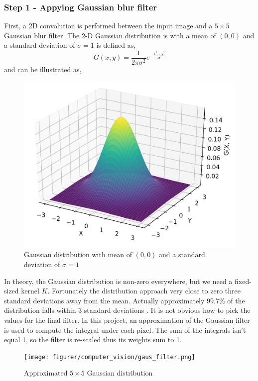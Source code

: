 \documentclass[11pt]{article}
\begin{document}
\subsubsection*{Step 1 - Appying Gaussian blur filter}

First, a 2D convolution is performed between the input image and a $5 \times 5$ Gaussian blur filter. The 2-D Gaussian distribution is with a mean of $(0, 0)$ and a standard deviation of $\sigma=1$ is defined as,
\begin{equation}
    G(x, y) = \frac{1}{2 \pi \sigma^{2}} e^{- \frac{x^{2} + y^{2}}{2 \sigma^{2}}}
\end{equation}
and can be illustrated as,
\begin{figure}[!h]
    \centering
    \includegraphics[scale=0.5]{figurer/computer_vision/gauss.png}
    \caption{Gaussian distribution with mean of $(0, 0)$ and a standard deviation of $\sigma=1$}
    \label{fig:computer_vision_gauss_distro}
\end{figure}

In theory, the Gaussian distribution is non-zero everywhere, but we need a fixed-sized kernel $K$. Fortunately the distribution approach very close to zero three standard deviations away from the mean. Actually approximately $99.7\%$ of the distribution falls within 3 standard deviations \cite{three-sigma-rule}. It is not obvious how to pick the values for the final filter. In this project, an approximation of the Gaussian filter is used to compute the integral under each pixel. The sum of the integrals isn't equal 1, so the filter is re-scaled thus its weights sum to 1.
\newpage
\begin{figure}[!h]
    \centering
    \texttt{[image: figurer/computer\_vision/gaus\_filter.png]}
    \caption{Approximated $5 \times 5$ Gaussian distribution}
    \label{fig:computer_vision_gauss_distro2}
\end{figure}
\end{document}
